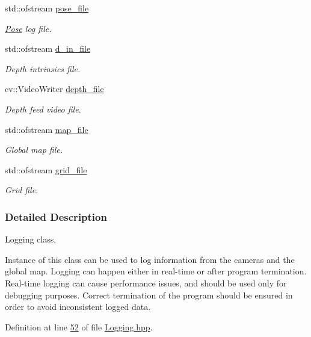 \begin{DoxyCompactItemize}
\item 
std\+::ofstream \hyperlink{classLogger_a7314c685ce4579a7d8b118e5d5327d13}{pose\+\_\+file}
\begin{DoxyCompactList}\small\item\em \hyperlink{structPose}{Pose} log file. \end{DoxyCompactList}\item 
std\+::ofstream \hyperlink{classLogger_acf9b6a89a6f8c520d010d87cff33b9df}{d\+\_\+in\+\_\+file}
\begin{DoxyCompactList}\small\item\em Depth intrinsics file. \end{DoxyCompactList}\item 
cv\+::\+Video\+Writer \hyperlink{classLogger_a5e5b9ad704575bda69b184a5b136735f}{depth\+\_\+file}
\begin{DoxyCompactList}\small\item\em Depth feed video file. \end{DoxyCompactList}\item 
std\+::ofstream \hyperlink{classLogger_a1aedce7141d1346bc39c94e3a3eba4d6}{map\+\_\+file}
\begin{DoxyCompactList}\small\item\em Global map file. \end{DoxyCompactList}\item 
std\+::ofstream \hyperlink{classLogger_a715ae637741f3b00ba8ebb9858cb5577}{grid\+\_\+file}
\begin{DoxyCompactList}\small\item\em Grid file. \end{DoxyCompactList}\end{DoxyCompactItemize}



\subsubsection{Detailed Description}
Logging class. 

Instance of this class can be used to log information from the cameras and the global map. Logging can happen either in real-\/time or after program termination. Real-\/time logging can cause performance issues, and should be used only for debugging purposes. Correct termination of the program should be ensured in order to avoid inconsistent logged data. 

Definition at line \hyperlink{Logging_8hpp_source_l00052}{52} of file \hyperlink{Logging_8hpp_source}{Logging.\+hpp}.




